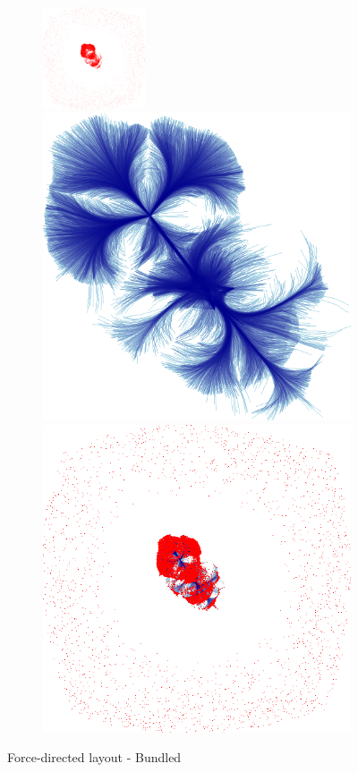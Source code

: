 \documentclass[12pt, a4paper]{article}
\begin{document}
\begin{figure}[H]
    \centering
    \begin{subfigure}[b]{\textwidth}
        \centering
        \includegraphics[width=0.33\textwidth]{src/youtube/datashader/simple/datashader/3_1}%
        \hfill
        \includegraphics[width=0.33\columnwidth]{src/youtube/datashader/simple/datashader/3_2}%
        \hfill
        \includegraphics[width=0.33\columnwidth]{src/youtube/datashader/simple/datashader/3_3}
    \end{subfigure}
    \caption{Force-directed layout - Bundled}
    \label{fig:ds_show_3}
\end{figure}
\end{document}
